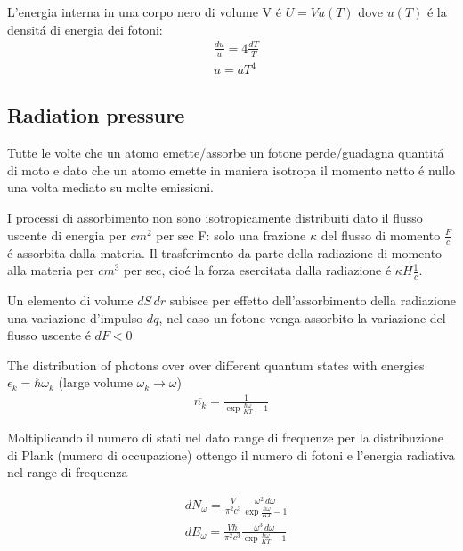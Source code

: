 \documentclass[oneside,12pt,fleqn]{memoir}
\begin{document}
L'energia interna in una corpo nero di volume V \'e $U=Vu(T)$ dove $u(T)$ \'e la densit\'a di energia dei fotoni:
\begin{align*}
&\frac{du}{u}=4\frac{dT}{T}\\
&u=aT^4
\end{align*}


\subsection{Radiation pressure}

Tutte le volte che un atomo emette/assorbe un fotone perde/guadagna quantit\'a di moto e dato che un atomo emette in maniera isotropa il momento netto \'e nullo una volta mediato su molte emissioni.

I processi di assorbimento non sono isotropicamente distribuiti dato il flusso uscente di energia per $cm^2$ per sec F: solo una frazione $\kappa$ del flusso di momento $\frac{F}{c}$ \'e assorbita dalla materia. Il trasferimento da parte della radiazione di momento alla materia per $cm^3$ per sec, cio\'e la forza esercitata dalla radiazione \'e $\kappa H \frac{1}{c}$.

Un elemento di volume $dS\,dr$ subisce per effetto dell'assorbimento della radiazione una variazione d'impulso $dq$, nel caso un fotone venga assorbito la variazione del flusso uscente \'e $dF<0$

The distribution of photons over over different quantum states with energies $\epsilon_k=\hbar\omega_k$ (large volume $\omega_k\to\omega$) 
\begin{align*}
\overline{n_k}=\frac{1}{\exp{\frac{\hbar\omega}{KT}}-1}
\end{align*}

Moltiplicando il numero di stati nel dato range di frequenze per la distribuzione di Plank (numero di occupazione) ottengo il numero di fotoni e l'energia radiativa nel range di frequenza

\begin{align*}
&dN_{\omega}=\frac{V}{\pi^2c^3}\frac{\omega^2\,d\omega}{\exp{\frac{\hbar\omega}{KT}}-1}\\
&dE_{\omega}=\frac{V\hbar}{\pi^2c^3}\frac{\omega^3\,d\omega}{\exp{\frac{\hbar\omega}{KT}}-1}
\end{align*}
\end{document}
